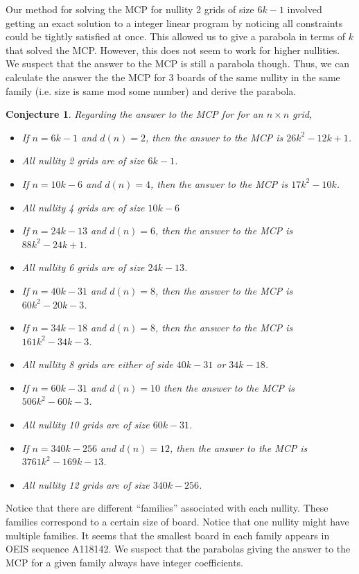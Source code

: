 \documentclass[a4paper]{article}
\newtheorem{conjecture}{Conjecture}
\begin{document}
	Our method for solving the MCP for nullity 2 grids of size $6k-1$ involved getting an exact solution to a integer linear program by noticing all constraints could be tightly satisfied at once.
	This allowed us to give a parabola in terms of $k$ that solved the MCP.
	However, this does not seem to work for higher nullities.
	We suspect that the answer to the MCP is still a parabola though.
	Thus, we can calculate the answer the the MCP for 3 boards of the same nullity in the same family (i.e. size is same mod some number) and derive the parabola.
	\begin{conjecture}
		Regarding the answer to the MCP for for an $n \times n$ grid,
		\begin{itemize}
			\item
				If $n = 6k-1$ and $d(n) = 2$, then the answer to the MCP is $26k^2 - 12k + 1$.
			\item
				All nullity 2 grids are of size $6k-1$.
			\item
				If $n = 10k - 6$ and $d(n) = 4$, then the answer to the MCP is $17k^2 - 10k$.
			\item
				All nullity 4 grids are of size $10k - 6$
			\item
				If $n = 24k - 13$ and $d(n) = 6$, then the answer to the MCP is $88k^2 - 24k + 1$.
			\item
				All nullity 6 grids are of size $24k-13$.
			\item
			 	If $n = 40k - 31$ and $d(n) = 8$, then the answer to the MCP is $60k^2 - 20k - 3$.
			 \item
			 	If $n = 34k - 18$ and $d(n) = 8$, then the answer to the MCP is $161k^2 - 34k - 3$.
			 \item
			 	All nullity 8 grids are either of side $40k-31$ or $34k-18$.
			 \item
			 	If $n = 60k - 31$ and $d(n) = 10$ then the answer to the MCP is $506k^2 - 60k - 3$.
			 \item
			 	All nullity 10 grids are of size $60k - 31$.
			 \item
			 	If $n = 340k - 256$ and $d(n) = 12$, then the answer to the MCP is $3761k^2 - 169k - 13$.
			 \item
			 	All nullity 12 grids are of size $340k - 256$.
		\end{itemize}
	\end{conjecture}
	Notice that there are different ``families'' associated with each nullity.
	These families correspond to a certain size of board.
	Notice that one nullity might have multiple families.
	It seems that the smallest board in each family appears in OEIS sequence A118142.
	We suspect that the parabolas giving the answer to the MCP for a given family always have integer coefficients.
\end{document}
